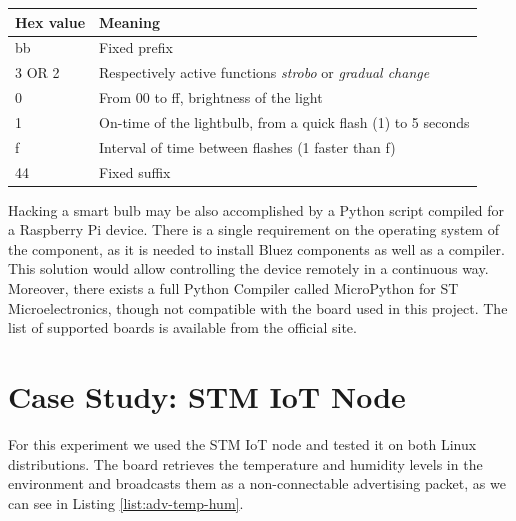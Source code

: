 \begin{minipage}{\linewidth}
	\centering
	 \label{tab:light-blebulb}
	\begin{tabular}{l l} 
	\hline
	Hex value &	Meaning  \\ \hline
	bb &	Fixed prefix  \\ 
	3 OR 2 &	Respectively active functions \textit{strobo} or \textit{gradual change} \\ 
	0 &	From 00 to ff, brightness of the light \\ 
	1 &	On-time of the lightbulb, from a quick flash (1) to 5 seconds \\ 
	f & Interval of time between flashes (1 faster than f)  \\ 
	44 & Fixed suffix  \\
\end {tabular}\par
\bigskip
\end{minipage}
	
Hacking a smart bulb may be also accomplished by a Python script compiled for a Raspberry Pi device. There is a single requirement on the operating system of the component, as it is needed to install Bluez components as well as a compiler. This solution would allow controlling the device remotely in a continuous way. Moreover, there exists a full Python Compiler called MicroPython for ST Microelectronics, though not compatible with the board used in this project. The list of supported boards is available from the official site.
	
\section{Case Study: STM IoT Node} 
For this experiment we used the STM IoT node and tested it on both Linux distributions. The board retrieves the temperature and humidity levels in the environment and broadcasts them as a non-connectable advertising packet, as we can see in Listing \ref{list:adv-temp-hum}.


